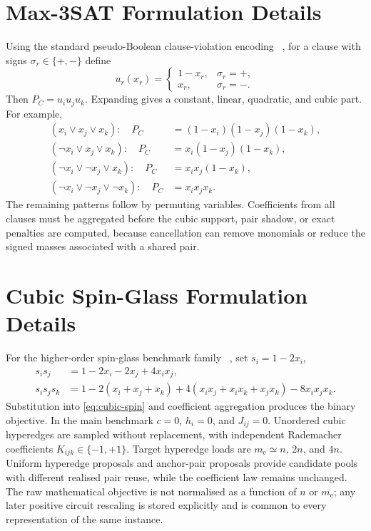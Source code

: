 \documentclass[a4paper,onecolumn,11pt,unpublished]{quantumarticle}
\theoremstyle{remark}
\begin{document}
\section{Max-3SAT Formulation Details}
\label{app:max3sat}

Using the standard pseudo-Boolean clause-violation encoding
~\cite{Nagies2025,Nusslein2023}, for a clause with signs
$\sigma_r\in\{+,-\}$ define
\begin{equation}
    u_r(x_r)=\begin{cases}1-x_r,&\sigma_r=+,\\x_r,&\sigma_r=-.\end{cases}
\end{equation}
Then $P_C=u_iu_ju_k$. Expanding gives a constant, linear, quadratic, and cubic part. For example,
\begin{align}
    (x_i\lor x_j\lor x_k):\quad
    P_C&=(1-x_i)(1-x_j)(1-x_k),\\
    (\neg x_i\lor x_j\lor x_k):\quad
    P_C&=x_i(1-x_j)(1-x_k),\\
    (\neg x_i\lor\neg x_j\lor x_k):\quad
    P_C&=x_ix_j(1-x_k),\\
    (\neg x_i\lor\neg x_j\lor\neg x_k):\quad
    P_C&=x_ix_jx_k.
\end{align}
The remaining patterns follow by permuting variables. Coefficients from all clauses must be aggregated before the cubic support, pair shadow, or exact penalties are computed, because cancellation can remove monomials or reduce the signed masses associated with a shared pair.

\section{Cubic Spin-Glass Formulation Details}
\label{app:spin-glass}

For the higher-order spin-glass benchmark family
~\cite{Basso2022,PelofskeShortDepth2024,Pelofske2024}, set $s_i=1-2x_i$,
\begin{align}
    s_is_j&=1-2x_i-2x_j+4x_ix_j,\\
    s_is_js_k&=1-2(x_i+x_j+x_k)
      +4(x_ix_j+x_ix_k+x_jx_k)-8x_ix_jx_k.
\end{align}
Substitution into \cref{eq:cubic-spin} and coefficient aggregation produces the
binary objective.  In the main benchmark $c=0$, $h_i=0$, and $J_{ij}=0$.
Unordered cubic hyperedges are sampled without replacement, with independent
Rademacher coefficients $K_{ijk}\in\{-1,+1\}$.  Target hyperedge loads are
$m_{\mathrm e}\simeq n$, $2n$, and $4n$.  Uniform hyperedge proposals and
anchor-pair proposals provide candidate pools with different realised pair
reuse, while the coefficient law remains unchanged.  The raw mathematical
objective is not normalised as a function of $n$ or $m_{\mathrm e}$; any later
positive circuit rescaling is stored explicitly and is common to every
representation of the same instance.
\end{document}

